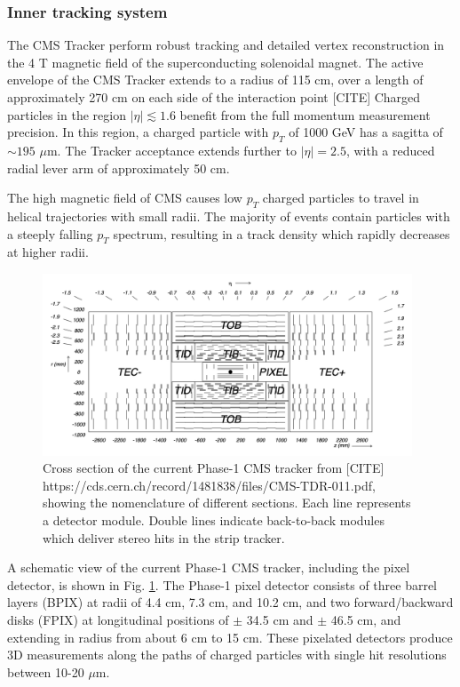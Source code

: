 \documentclass{article}
\begin{document}
\subsubsection{Inner tracking system}
The CMS Tracker perform robust tracking and detailed vertex reconstruction in the 4 T magnetic field of the superconducting solenoidal magnet. The active envelope of the CMS Tracker extends to a radius of 115 cm, over a length of approximately 270 cm on each side of the interaction point [CITE] %
Charged particles in the region $|\eta| \lesssim 1.6$ benefit from the full momentum measurement precision. In this region, a charged particle with $p_T$ of 1000 GeV has a sagitta of $\sim 195$ $\mu$m. The Tracker acceptance extends further to $|\eta| = 2.5$, with a reduced radial lever arm of approximately 50 cm.

The high magnetic field of CMS causes low $p_{T}$ charged particles to travel in helical trajectories with small radii. The majority of events contain particles with a steeply falling $p_{T}$ spectrum, resulting in a track density which rapidly decreases at higher radii. 

\begin{figure}[ht]
    \centering
    \includegraphics[width=11cm]{figures/phase-1-tdr-tracker-schematic.png}
    \caption{Cross section of the current Phase-1 CMS tracker from [CITE] https://cds.cern.ch/record/1481838/files/CMS-TDR-011.pdf, showing the nomenclature of different sections. Each line represents a detector module. Double lines indicate back-to-back modules which deliver stereo hits in the strip tracker.}
    \label{fig:phase-1-tdr-tracker-schematic}
\end{figure}


A schematic view of the current Phase-1 CMS tracker, including the pixel detector, is shown in Fig. \ref{fig:phase-1-tdr-tracker-schematic}. The Phase-1 pixel detector consists of three barrel layers (BPIX) at radii of 4.4 cm, 7.3 cm, and 10.2 cm, and two forward/backward disks (FPIX) at longitudinal positions of $\pm$ 34.5 cm and $\pm$ 46.5 cm, and extending in radius from about 6 cm to 15 cm. These pixelated detectors produce 3D measurements along the paths of charged particles with single hit resolutions between 10-20 $\mu$m. 
\end{document}
